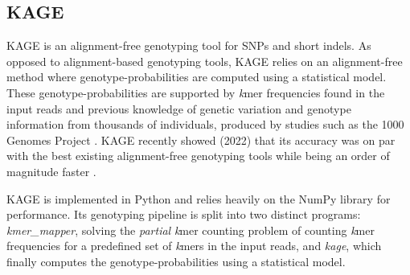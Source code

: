 \subsection{KAGE} \label{background:kage}
KAGE \cite{kage} is an alignment-free genotyping tool for SNPs and short indels.
As opposed to alignment-based genotyping tools, KAGE relies on an alignment-free method where genotype-probabilities are computed using a statistical model.
These genotype-probabilities are supported by \textit{k}mer frequencies found in the input reads and previous knowledge of genetic variation and genotype information from thousands of individuals, produced by studies such as the 1000 Genomes Project \cite{1000_genomes_project}.
KAGE recently showed (2022) that its accuracy was on par with the best existing alignment-free genotyping tools while being an order of magnitude faster \cite{kage}.

KAGE is implemented in Python and relies heavily on the NumPy library for performance.
Its genotyping pipeline is split into two distinct programs: \textit{kmer\_mapper}, solving the \textit{partial} \textit{k}mer counting problem of counting \textit{k}mer frequencies for a predefined set of \textit{k}mers in the input reads, and \textit{kage}, which finally computes the genotype-probabilities using a statistical model.

